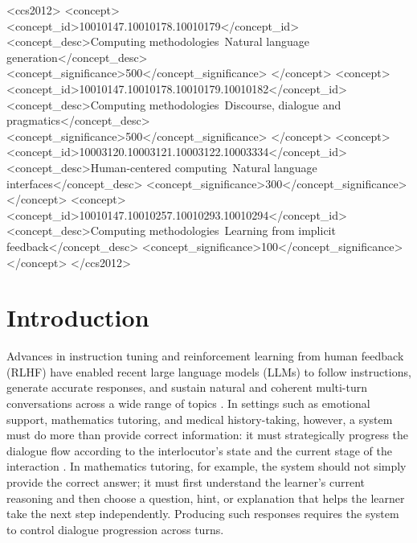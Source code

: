 \documentclass[manuscript,review,anonymous]{acmart}
\begin{document}
\begin{CCSXML}
<ccs2012>
 <concept>
  <concept_id>10010147.10010178.10010179</concept_id>
  <concept_desc>Computing methodologies~Natural language generation</concept_desc>
  <concept_significance>500</concept_significance>
 </concept>
 <concept>
  <concept_id>10010147.10010178.10010179.10010182</concept_id>
  <concept_desc>Computing methodologies~Discourse, dialogue and pragmatics</concept_desc>
  <concept_significance>500</concept_significance>
 </concept>
 <concept>
  <concept_id>10003120.10003121.10003122.10003334</concept_id>
  <concept_desc>Human-centered computing~Natural language interfaces</concept_desc>
  <concept_significance>300</concept_significance>
 </concept>
 <concept>
  <concept_id>10010147.10010257.10010293.10010294</concept_id>
  <concept_desc>Computing methodologies~Learning from implicit feedback</concept_desc>
  <concept_significance>100</concept_significance>
 </concept>
</ccs2012>
\end{CCSXML}



\maketitle

\section{Introduction}
\label{sec:intro}

Advances in instruction tuning and reinforcement learning from human feedback (RLHF) have enabled recent large language models (LLMs) to follow instructions, generate accurate responses, and sustain natural and coherent multi-turn conversations across a wide range of topics \cite{ouyang2022instructgpt}. In settings such as emotional support, mathematics tutoring, and medical history-taking, however, a system must do more than provide correct information: it must strategically progress the dialogue flow according to the interlocutor's state and the current stage of the interaction \cite{rashkin2019empathetic,liu2021esconv}. In mathematics tutoring, for example, the system should not simply provide the correct answer; it must first understand the learner's current reasoning and then choose a question, hint, or explanation that helps the learner take the next step independently. Producing such responses requires the system to control dialogue progression across turns.
\end{document}
